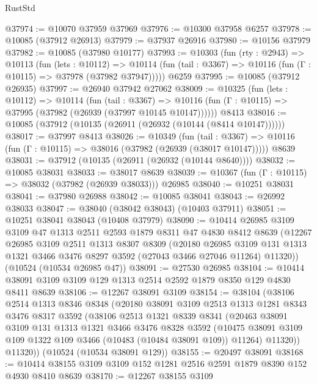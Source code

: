 \begin{lexlean}{RustStd}
\begin{coremodule}
@37974 := @10070 @37959 @37969
@37976 := @10300 @37958 @6257
@37978 := @10085 (@37912 @26913)
@37979 := @37937 @26916
@37980 := @10156 @37979
@37982 := @10085 (@37980 @10177)
@37993 := @10303
    (fun (rty : @2943) =>
    @10113
      (fun (lets : @10112) =>
      @10114 (fun (tail : @3367) => @10116 (fun (Γ : @10115) => @37978 (@37982 @37947)))))
    @6259
@37995 := @10085 (@37912 @26935)
@37997 := @26940 @37942 @27062
@38009 := @10325
    (fun (lets : @10112) =>
    @10114
      (fun (tail : @3367) =>
      @10116 (fun (Γ : @10115) => @37995 (@37982 (@26939 (@37997 @10145 @10147))))))
    @8413
@38016 := @10085 (@37912 (@10135 (@26911 (@26932 (@10144 (@8414 @10147))))))
@38017 := @37997 @8413
@38026 := @10349
    (fun (tail : @3367) => @10116 (fun (Γ : @10115) => @38016 (@37982 (@26939 (@38017 @10147)))))
    @8639
@38031 := @37912 (@10135 (@26911 (@26932 (@10144 @8640))))
@38032 := @10085 @38031
@38033 := @38017 @8639
@38039 := @10367 (fun (Γ : @10115) => @38032 (@37982 (@26939 @38033))) @26985
@38040 := @10251 @38031
@38041 := @37980 @26988
@38042 := @10085 @38041
@38043 := @26992 @38033
@38047 := @38040 (@38042 @38043) (@10403 @37911)
@38051 := @10251 @38041 @38043 (@10408 @37979)
@38090 := @10414
    @26985
    @3109
    @3109
    @47
    @1313
    @2511
    @2593
    @1879
    @8311
    @47
    @4830
    @8412
    @8639
    (@12267
      @26985
      @3109
      @2511
      @1313
      @8307
      @8309
      (@20180
        @26985
        @3109
        @131
        @1313
        @1321
        @3466
        @3476
        @8297
        @3592
        (@27043 @3466 @27046 @11264)
        @11320))
    (@10524 (@10534 @26985 @47))
@38091 := @27530 @26985
@38104 := @10414 @38091 @3109 @3109 @129 @1313 @2514 @2592 @1879 @8350 @129 @4830 @8411 @8639
@38106 := @12267 @38091 @3109
@38154 := @38104
    (@38106
      @2514
      @1313
      @8346
      @8348
      (@20180
        @38091
        @3109
        @2513
        @1313
        @1281
        @8343
        @3476
        @8317
        @3592
        (@38106
          @2513
          @1321
          @8339
          @8341
          (@20463
            @38091
            @3109
            @131
            @1313
            @1321
            @3466
            @3476
            @8328
            @3592
            (@10475 @38091 @3109 @109 @1322 @109 @3466 (@10483 (@10484 @38091 @109)) @11264)
            @11320))
        @11320))
    (@10524 (@10534 @38091 @129))
@38155 := @20497 @38091
@38168 := @10414 @38155 @3109 @3109 @152 @1281 @2516 @2591 @1879 @8390 @152 @4930 @8410 @8639
@38170 := @12267 @38155 @3109

\end{coremodule}
\end{lexlean}
